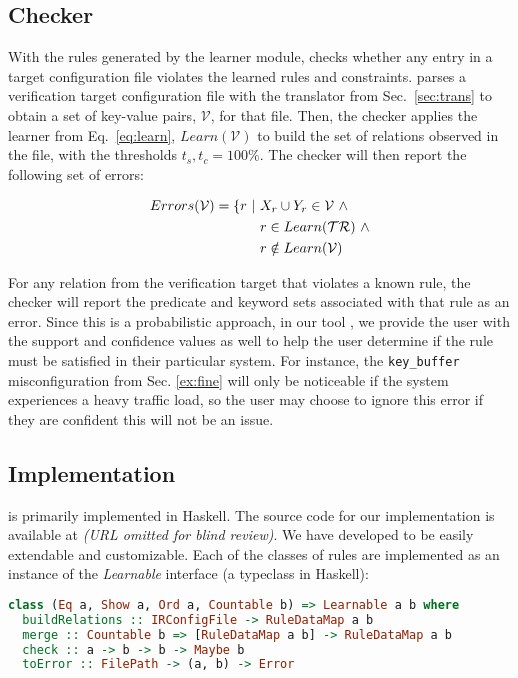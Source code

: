 \subsection{Checker}
\label{sec-checker}

With the rules generated by the learner module, \app checks whether any entry in a target configuration file violates the learned rules and constraints.
\app parses a verification target configuration file with the translator from Sec.~\ref{sec:trans}  to obtain a set of key-value pairs, $\mathcal{V}$, for that file.
Then, the checker applies the learner from Eq.~\ref{eq:learn}, $Learn(\mathcal{V})$ to build the set of relations observed in the file, with the thresholds $t_s,t_c = 100\%$. 
The checker will then report the following set of errors:

\begin{align*}
Errors(\mathcal{V}) = \{ r\ |\ & X_r \cup Y_r \in \mathcal{V} \ \land \\
                               & r \in Learn(\trainingSet) \ \land \\
                               & r \notin Learn(\mathcal{V})
\end{align*}

For any relation from the verification target that violates a known rule, the checker will report the predicate and keyword sets associated with that rule as an error.
Since this is a probabilistic approach, in our tool \app, we provide the user with the support and confidence values as well to help the user determine if the rule must be satisfied in their particular system.
For instance, the \texttt{key\_buffer} misconfiguration from Sec. \ref{ex:fine} will only be noticeable if the system experiences a heavy traffic load, so the user may choose to ignore this error if they are confident this will not be an issue.

\iffalse
\subsection{Implementation}

\app is primarily implemented in Haskell.
The source code for our implementation is available at {\em (URL omitted for blind review)}.
We have developed \app to be easily extendable and customizable. Each of the classes of rules are implemented as an instance of the \textit{Learnable} interface (a typeclass in Haskell):

\begin{lstlisting}[language=Haskell, xleftmargin=.01\textwidth]
class (Eq a, Show a, Ord a, Countable b) => Learnable a b where
  buildRelations :: IRConfigFile -> RuleDataMap a b
  merge :: Countable b => [RuleDataMap a b] -> RuleDataMap a b
  check :: a -> b -> b -> Maybe b
  toError :: FilePath -> (a, b) -> Error
\end{lstlisting} 

